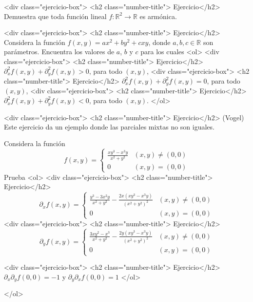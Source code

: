 \documentclass{article}
\theoremstyle{definition}
\begin{document}
  <div class="ejercicio-box"> <h2 class="number-title"> Ejercicio</h2> Demuestra que toda función
    lineal $f:\mathbb{R}^2\to \mathbb{R}$ es armónica.
    
                
  <div class="ejercicio-box"> <h2 class="number-title"> Ejercicio</h2> Considera la función $f(x,y)=ax^2+by^2+cxy$,
    donde $a,b,c\in \mathbb{R}$ son parámetros. Encuentra
    los valores de $a$, $b$ y $c$ para los cuales
    <ol>
    <div class="ejercicio-box"> <h2 class="number-title"> Ejercicio</h2> $\partial_x^2 f(x,y)+\partial_y^2f(x,y) >0$, para todo $(x,y)$,
    <div class="ejercicio-box"> <h2 class="number-title"> Ejercicio</h2> $\partial_x^2f(x,y)+\partial_y^2f(x,y)=0$, para todo $(x,y)$,
    <div class="ejercicio-box"> <h2 class="number-title"> Ejercicio</h2> $\partial_x^2f(x,y)+\partial_y^2f(x,y)<0$, para todo $(x,y)$.
    </ol>
                  
 
    
  <div class="ejercicio-box"> <h2 class="number-title"> Ejercicio</h2> (Vogel) Este ejercicio da un ejemplo
    donde las parciales mixtas no son iguales.

    Considera la función
    $$
    f(x,y)=\left\{
      \begin{array}{cc}
        \frac{xy^3-x^3y}{x^2+y^2} & (x,y)\ne (0,0)\\
        0 & (x,y)=(0,0)
      \end{array}
    \right.
    $$
    Prueba
    <ol>
    <div class="ejercicio-box"> <h2 class="number-title"> Ejercicio</h2>
      $$
      \partial_xf(x,y)=\left\{
        \begin{array}{cc}
          \frac{y^3-3x^2y}{x^2+y^2}- \frac{2x(xy^3-x^3y)}{(x^2+y^2)^2}
          & (x,y)\ne (0,0)\\
          0 & (x,y)=(0,0)
        \end{array}
      \right.
      $$
    <div class="ejercicio-box"> <h2 class="number-title"> Ejercicio</h2>
      $$
      \partial_y f(x,y)=\left\{
        \begin{array}{cc}
          \frac{3xy^2-x^3}{x^2+y^2}- \frac{2y(xy^3-x^3y)}{(x^2+y^2)^2}
          & (x,y)\ne (0,0)\\
          0 & (x,y)=(0,0)
        \end{array}
      \right.
      $$
      
    <div class="ejercicio-box"> <h2 class="number-title"> Ejercicio</h2> $\partial_x \partial_yf(0,0)=-1$ y $\partial_y\partial_xf(0,0)=1$
    </ol>



    
  </ol>
  
  
       
\end{document}
